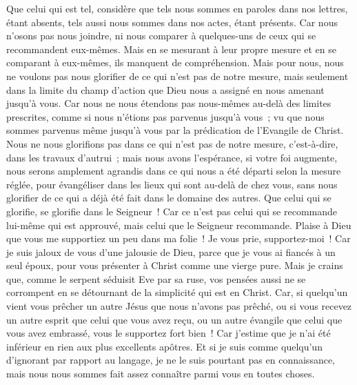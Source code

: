 \begin{multicols}{2}
Que celui qui est tel, considère que tels nous sommes en paroles dans nos lettres, étant absents, tels aussi nous sommes dans nos actes, étant présents.
Car nous n'osons pas nous joindre, ni nous comparer à quelques-uns de ceux qui se recommandent eux-mêmes. Mais en se mesurant à leur propre mesure et en se comparant à eux-mêmes, ils manquent de compréhension.
Mais pour nous, nous ne voulons pas nous glorifier de ce qui n'est pas de notre mesure, mais seulement dans la limite du champ d'action que Dieu nous a assigné en nous amenant jusqu'à vous.
Car nous ne nous étendons pas nous-mêmes au-delà des limites prescrites, comme si nous n'étions pas parvenus jusqu'à vous~; vu que nous sommes parvenus même jusqu'à vous par la prédication de l'Evangile de Christ.
Nous ne nous glorifions pas dans ce qui n'est pas de notre mesure, c'est-à-dire, dans les travaux d'autrui~; mais nous avons l'espérance, si votre foi augmente, nous serons amplement agrandis dans ce qui nous a été départi selon la mesure réglée,
pour évangéliser dans les lieux qui sont au-delà de chez vous, sans nous glorifier de ce qui a déjà été fait dans le domaine des autres.
Que celui qui se glorifie, se glorifie dans le Seigneur~!
Car ce n'est pas celui qui se recommande lui-même qui est approuvé, mais celui que le Seigneur recommande.
\VerseOne{}Plaise à Dieu que vous me supportiez un peu dans ma folie~! Je vous prie, supportez-moi~!
Car je suis jaloux de vous d'une jalousie de Dieu, parce que je vous ai fiancés à un seul époux, pour vous présenter à Christ comme une vierge pure.
Mais je crains que, comme le serpent séduisit Eve par sa ruse, vos pensées aussi ne se corrompent en se détournant de la simplicité qui est en Christ.
Car, si quelqu'un vient vous prêcher un autre Jésus que nous n'avons pas prêché, ou si vous recevez un autre esprit que celui que vous avez reçu, ou un autre évangile que celui que vous avez embrassé, vous le supportez fort bien~!
Car j'estime que je n'ai été inférieur en rien aux plus excellents apôtres.
Et si je suis comme quelqu'un d'ignorant par rapport au langage, je ne le suis pourtant pas en connaissance, mais nous nous sommes fait assez connaître parmi vous en toutes choses.

\end{multicols}
